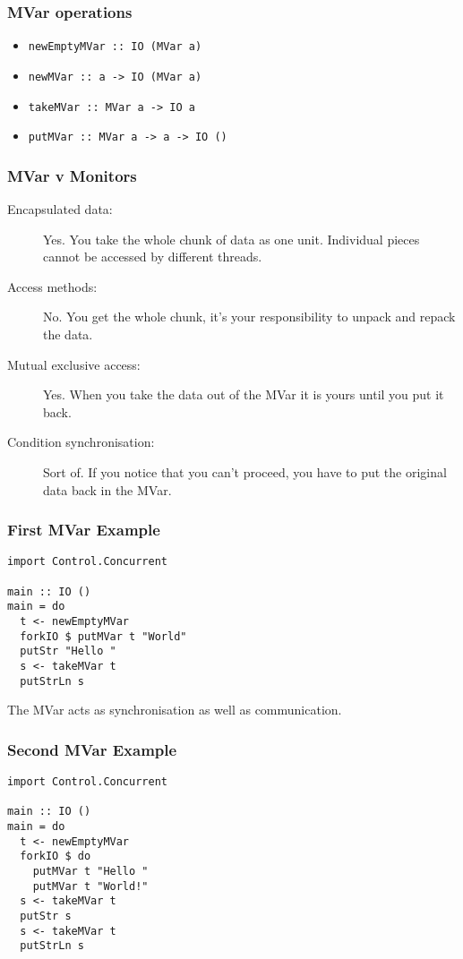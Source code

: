 \documentclass[notheorems]{beamer}%
\theoremstyle{definition}
\begin{document}
\begin{frame}[fragile]
  \frametitle{MVar operations}
  \begin{itemize}
  \item \verb=newEmptyMVar :: IO (MVar a)=
  \item \verb=newMVar :: a -> IO (MVar a)=
  \item \verb=takeMVar :: MVar a -> IO a=
  \item \verb=putMVar :: MVar a -> a -> IO ()=
  \end{itemize}
\end{frame}

\begin{frame}
  \frametitle{MVar v Monitors}
  \begin{description}
  \item[Encapsulated data:] Yes. You take the whole chunk of data as one
    unit. Individual pieces cannot be accessed by different threads.
  \item[Access methods:] No. You get the whole chunk, it's your responsibility
    to unpack and repack the data.
  \item[Mutual exclusive access:] Yes. When you take the data out of the MVar
    it is yours until you put it back.
  \item[Condition synchronisation:] Sort of. If you notice that you can't
    proceed, you have to put the original data back in the MVar.
  \end{description}
\end{frame}

\begin{frame}[fragile]
  \frametitle{First MVar Example}
\begin{verbatim}
import Control.Concurrent

main :: IO ()
main = do
  t <- newEmptyMVar
  forkIO $ putMVar t "World"
  putStr "Hello "
  s <- takeMVar t
  putStrLn s
\end{verbatim}
  The MVar acts as \alert{synchronisation} as well as
  \alert{communication}.
\end{frame}

\begin{frame}[fragile]
  \frametitle{Second MVar Example}
\begin{verbatim}
import Control.Concurrent

main :: IO ()
main = do
  t <- newEmptyMVar
  forkIO $ do
    putMVar t "Hello "
    putMVar t "World!"
  s <- takeMVar t
  putStr s
  s <- takeMVar t
  putStrLn s
\end{verbatim}
\end{frame}
\end{document}
